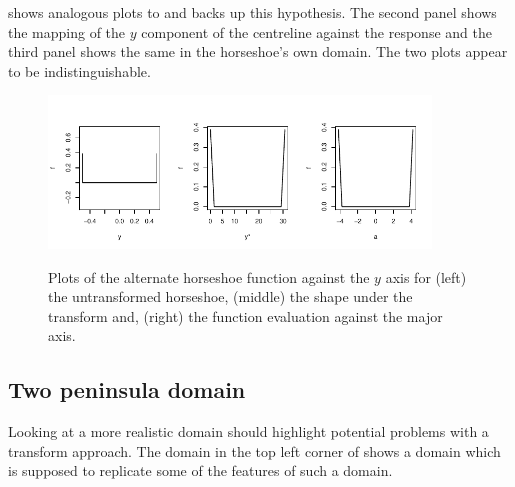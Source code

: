 shows analogous plots to  and backs up this hypothesis. The second panel shows the mapping of the $y$ component of the centreline against the response and the third panel shows the same in the horseshoe's own domain. The two plots appear to be indistinguishable.

\begin{figure}
\centering
\includegraphics[width=4in]{sc/figs/altcentrelinelineplots.pdf} \\
\caption{Plots of the alternate horseshoe function against the $y$ axis for (left) the untransformed horseshoe, (middle) the shape under the \sch transform and, (right) the function evaluation against the major axis.}
\label{altcentrelinelineplot}
\end{figure}

\subsection{Two peninsula domain}

Looking at a more realistic domain should highlight potential problems with a \sch transform approach. The domain in the top left corner of  shows a domain which is supposed to replicate some of the features of such a domain.

